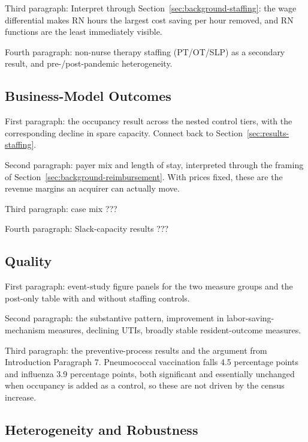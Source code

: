 \documentclass[12pt]{article}
\begin{document}
\medskip
\noindent Third paragraph: Interpret through Section~\ref{sec:background-staffing}: the wage differential makes RN hours the largest cost saving per hour removed, and RN functions are the least immediately visible. 

\medskip
\noindent Fourth paragraph: non-nurse therapy staffing (PT/OT/SLP) as a secondary result, and pre-/post-pandemic heterogeneity.

\subsection{Business-Model Outcomes}

\noindent First paragraph: the occupancy result across the nested control tiers, with the corresponding decline in spare capacity. Connect back to Section~\ref{sec:results-staffing}.

\medskip
\noindent Second paragraph: payer mix and length of stay, interpreted through the framing of Section~\ref{sec:background-reimbursement}. With prices fixed, these are the revenue margins an acquirer can actually move.

\medskip
\noindent Third paragraph: case mix ???

\medskip
\noindent Fourth paragraph: Slack-capacity results ???

\subsection{Quality} \label{sec:results-quality}

\noindent First paragraph: event-study figure panels for the two measure groups and the post-only table with and without staffing controls.

\medskip
\noindent Second paragraph: the substantive pattern, improvement in labor-saving-mechanism measures, declining UTIs, broadly stable resident-outcome measures.

\medskip
\noindent Third paragraph: the preventive-process results and the argument from Introduction Paragraph 7. Pneumococcal vaccination falls 4.5 percentage points and influenza 3.9 percentage points, both significant and essentially unchanged when occupancy is added as a control, so these are not driven by the  census increase.

\subsection{Heterogeneity and Robustness}
\end{document}
